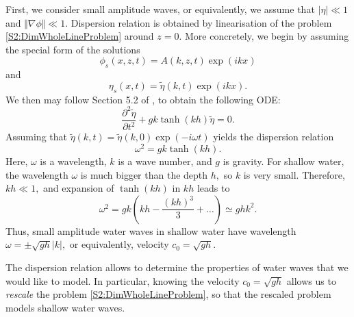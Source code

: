 \documentclass[11pt,reqno,oneside,a4paper]{article}
\begin{document}
First, we consider small amplitude waves, or equivalently, we assume that $|\eta| \ll 1$ and $\Vert \nabla \phi \Vert \ll 1.$ Dispersion relation is obtained by linearisation of the problem \eqref{S2:DimWholeLineProblem} around $z=0.$ More concretely, we begin by assuming the special form of the solutions
\[
\phi_s(x,z,t) = A(k,z,t) \exp(ikx) 
\]
and 
\[ 
\eta_s(x,t) = \tilde{\eta}(k,t)\exp(ikx).
\]
We then may follow Section 5.2 of \cite{Ablowitz}, to obtain the following ODE:
\[ 
\frac{\partial^2 \tilde{\eta}}{\partial t^2} + g k \tanh(k h) \tilde{\eta} = 0.
\]
Assuming that $ \tilde{\eta}(k,t) = \tilde{\eta}(k, 0) \exp(-i \omega t)$ yields the dispersion relation
\[ 
\omega^2 = g k \tanh(k h).
\]
Here, $\omega$ is a wavelength, $k$ is a wave number, and $g$ is gravity. For shallow water, the wavelength $\omega$ is much bigger than the depth $h,$ so $k$ is very small. Therefore, $kh \ll 1,$ and expansion of $\tanh(kh)$ in $kh$ leads to
\[ \omega^2 = gk(kh - \frac{(kh)^3}{3} + \ldots)  \simeq ghk^2. \]
Thus, small amplitude water waves in shallow water have wavelength $ \omega = \pm \sqrt{gh}|k|,$ or equivalently, velocity $c_0 = \sqrt{gh}.$ 

The dispersion relation allows to determine the properties of water waves that we would like to model. In particular, knowing the velocity $c_0 = \sqrt{gh}$ allows us to \textit{rescale} the problem \eqref{S2:DimWholeLineProblem}, so that the rescaled problem models shallow water waves.
\end{document}
